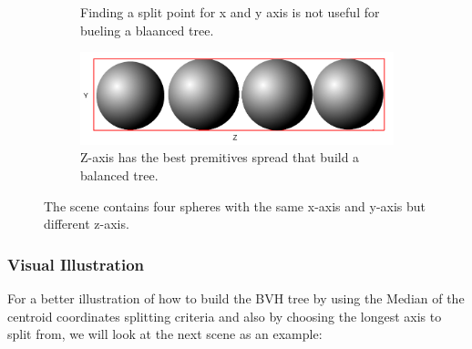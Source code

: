 \documentclass[11pt,a4paper]{article}
\begin{document}
\begin{figure}[H]
\begin{subfigure}[b]{0.3\textwidth}
         \caption{Finding a split point for x and y axis is not useful for bueling a blaanced tree.}
         \label{fig:pi_5000}
     \end{subfigure}
     \hfill
     \begin{subfigure}[b]{0.3\textwidth}
         \centering
         \includegraphics[width=\textwidth]{images/LONGAXIS_Z.png}
         \caption{Z-axis has the best premitives spread that build a balanced tree.}
         \label{fig:pi_18000}
     \end{subfigure}
        \captionsetup{justification=centering,margin=2cm}
        \caption{The scene contains four spheres with the same x-axis and y-axis but different z-axis. }
        \label{fig:three graphs}
\end{figure}

\subsubsection{Visual Illustration}
For a better illustration of how to build the BVH tree by using the Median of the centroid coordinates splitting criteria and also by choosing the longest axis to split from, we will look at the next scene as an example: 
\end{document}
